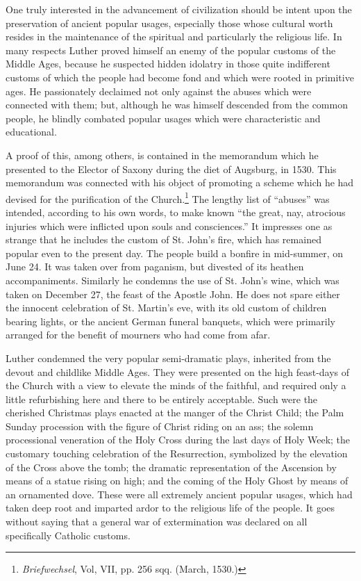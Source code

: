 One truly interested in the advancement of civilization should be
intent upon the preservation of ancient popular usages, especially
those whose cultural worth resides in the maintenance of the spiritual and
particularly the religious life. In many respects Luther proved himself
an enemy of the popular customs of the Middle Ages, because he
suspected hidden idolatry in those quite indifferent customs of which
the people had become fond and which were rooted in primitive
ages. He passionately declaimed not only against the abuses which
were connected with them; but, although he was himself descended
from the common people, he blindly combated popular usages which
were characteristic and educational.

A proof of this, among others, is contained in the memorandum
which he presented to the Elector of Saxony during the diet of Augsburg,
in 1530. This memorandum was connected with his object of
promoting a scheme which he had devised for the purification of the
Church.\footnote{\textit{Briefwechsel}, Vol, VII, pp. 256 sqq. (March, 1530.)}
 The lengthy list of “abuses” was intended, according to
his own words, to make known “the great, nay, atrocious injuries
which were inflicted upon souls and consciences.”
It impresses one as strange that he includes the custom of St. John’s fire,
which has remained popular even to the present day. The people build a
bonfire in mid-summer, on June 24. It was taken over from paganism,
but divested of its heathen accompaniments. Similarly he condemns the use
of St. John’s wine, which was taken on December 27, the feast of the
Apostle John. He does not spare either the innocent celebration of St.
Martin’s eve, with its old custom of children bearing lights, or the ancient German
funeral banquets, which were primarily arranged for the benefit of
mourners who had come from afar.

Luther condemned the very popular semi-dramatic plays, inherited from
the devout and childlike Middle Ages. They were presented on the high
feast-days of the Church with a view to elevate the minds of the faithful,
and required only a little refurbishing here and there to be entirely
acceptable. Such were the cherished Christmas plays enacted at the manger
of the Christ Child; the Palm Sunday procession with the figure of Christ
riding on an ass; the solemn processional veneration of the Holy Cross
during the last days of Holy Week; the customary touching celebration of the
Resurrection, symbolized by the elevation of the Cross above the tomb;
the dramatic representation of the Ascension by means of a statue rising on
high; and the coming of the Holy Ghost by means of an ornamented dove.
These were all extremely ancient popular usages, which had taken deep root
and imparted ardor to the religious life of the people. It goes without saying
that a general war of extermination was declared on all specifically Catholic
customs.

